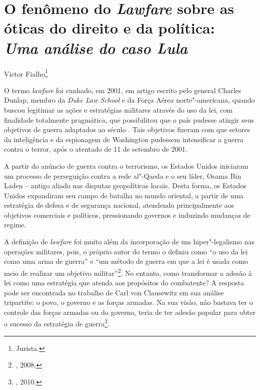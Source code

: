 \chapter*{O fenômeno do \emph{Lawfare} sobre as óticas do direito e da política:\\
\emph{Uma análise do caso Lula}}

\begin{flushright}
Victor Fialho\footnote{Jurista.}
\end{flushright}

O termo \emph{lawfare} foi cunhado, em 2001, em artigo escrito pelo
general Charles Dunlap, membro da \emph{Duke Law School} e da Força
Aérea norte"-americana, quando buscou legitimar as ações e estratégias
militares através do uso da lei, com finalidade totalmente pragmática,
que possibilitou que o país pudesse atingir seus objetivos de guerra
adaptados ao século . Tais objetivos fizeram com que setores da
inteligência e da espionagem de Washington pudessem intensificar a
guerra contra o terror, após o atentado de 11 de setembro de 2001.

A partir do anúncio de guerra contra o terrorismo, os Estados Unidos
iniciaram um processo de perseguição contra a rede al"-Qaeda e o seu
líder, Osama Bin Laden -- antigo aliado nas disputas geopolíticas locais.
Desta forma, os Estados Unidos expandiram seu campo de batalha no mundo
oriental, a partir de uma estratégia de defesa e de segurança nacional,
atendendo principalmente aos objetivos comerciais e políticos,
pressionando governos e induzindo mudanças de regime.

A definição de \emph{lawfare} foi muito além da incorporação de um
hiper"-legalismo nas operações militares, pois, o próprio autor do termo
o definiu como ``o uso da lei como uma arma de guerra'' e ``um método de
guerra em que a lei é usada como meio de realizar um objetivo militar''\footnote{, 2008.}. No entanto, como transformar a adesão à lei como uma
estratégia que atenda aos propósitos do combatente? A resposta pode ser
encontrada no trabalho de Carl von Clausewitz em sua análise tripartite:
o povo, o governo e as forças armadas. Na sua visão, não bastava ter o
controle das forças armadas ou do governo, teria de ter adesão popular
para obter o sucesso da estratégia de guerra\footnote{, 2010.}.

